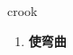 
\begin{frame}
{\huge crook}
\begin{center}
\begin{enumerate}\Large
  \item \textbf{使弯曲}
\end{enumerate}
\end{center}
\end{frame}
